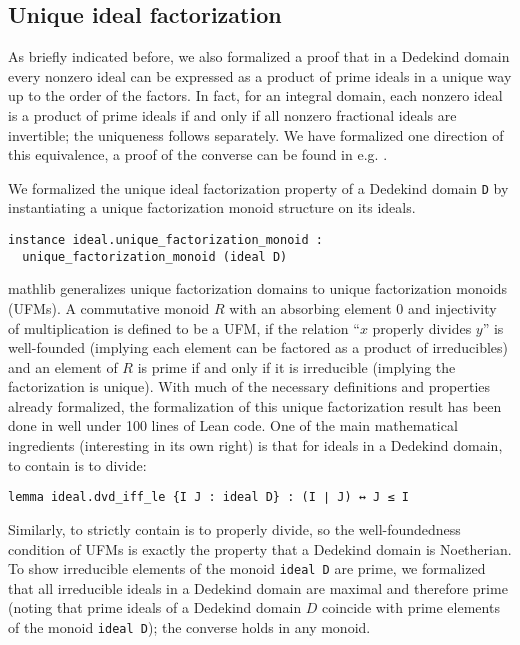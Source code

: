 \documentclass[sn-mathphys]{sn-jnl}%
\newcommand{\lean}[1]{\texttt{#1}\xspace}
\newcommand{\mathlib}{\textsf{mathlib}\xspace}
\begin{document}
\subsection{Unique ideal factorization}\label{subsec:unique_ideal_factorization}

As briefly indicated before, we also formalized a proof that in a Dedekind domain every nonzero ideal can be expressed as a product of prime ideals in a unique way up to the order of the factors.
In fact, for an integral domain, each nonzero ideal is a product of prime ideals if and only if all nonzero fractional ideals are invertible; the uniqueness follows separately. We have formalized one direction of this equivalence, a proof of the converse can be found in e.g. \cite[Chapter 5, , Theorem 10]{Zariski-Samuel}.

We formalized the unique ideal factorization property of a Dedekind domain \lean{D} by instantiating a unique factorization monoid structure on its ideals.

\begin{lstlisting}
instance ideal.unique_factorization_monoid :
  unique_factorization_monoid (ideal D)
\end{lstlisting}

\mathlib generalizes unique factorization domains to unique factorization monoids (UFMs).
A commutative monoid $R$ with an absorbing element $0$ and injectivity of multiplication is defined to be a UFM,
if the relation ``$x$ properly divides $y$'' is well-founded (implying each element can be factored as a product of irreducibles) and
an element of $R$ is prime if and only if it is irreducible (implying the factorization is unique).
With much of the necessary definitions and properties already formalized, the formalization of this unique factorization result has been done in well under 100 lines of Lean code. One of the main mathematical ingredients (interesting in its own right) is that for ideals in a Dedekind domain, to contain is to divide:

\begin{lstlisting}
lemma ideal.dvd_iff_le {I J : ideal D} : (I ∣ J) ↔ J ≤ I
\end{lstlisting}

Similarly, to strictly contain is to properly divide, so the well-foundedness condition of UFMs is exactly the property that a Dedekind domain is Noetherian. To show irreducible elements of the monoid \lean{ideal D} are prime, we formalized that all irreducible ideals in a Dedekind domain are maximal and therefore prime (noting that prime ideals of a Dedekind domain $D$ coincide with prime elements of the monoid \lean{ideal D}); the converse holds in any monoid.
\end{document}
